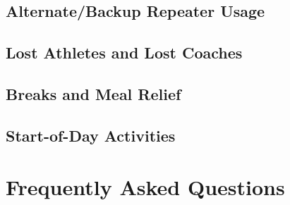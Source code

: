 \documentclass[pdflatex,letterpaper,twoside,12pt]{book}
\begin{document}
\iffalse %
 * Clearly define process or criteria in which we begin collecting or
   disseminating weather data? 
\fi %


\section{Alternate/Backup Repeater Usage}


\section{Lost Athletes and Lost Coaches}


\section{Breaks and Meal Relief}

\iffalse %
Director will now be responsible for getting meals to the net control folks, 
this worked perfect this time!
\fi %


\section{Start-of-Day Activities}

\iffalse %
 * Need notice for security to charge radios at night
     o Send a reminder voice communication Friday and Saturday Evenings
       (Logistics Control) 
\fi %


\chapter{Frequently Asked Questions}

\iffalse %
 * Need to develop a FAQ - Net control runs event, Do Not Call 911,
   Don't know? Ask Net control, etc... Get food, and stay hydrated! 3rd
   party traffic is allowed - know when to hand the radio to that person! 
\fi %
\end{document}
